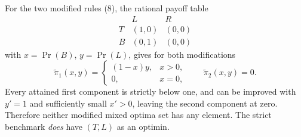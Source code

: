 \documentclass[11pt,a4paper]{article}
\begin{document}
For the two modified rules (8), the rational payoff table
\[
 \begin{array}{c|cc}
 &L&R\\\hline
 T&(1,0)&(0,0)\\
 B&(0,1)&(0,0)
 \end{array}
\tag{OPT.15}
\]
with $x=\Pr(B)$, $y=\Pr(L)$, gives for both modifications
\[
 \widetilde\pi_1(x,y)=\begin{cases}(1-x)y,&x>0,\\0,&x=0,\end{cases}
 \qquad\widetilde\pi_2(x,y)=0.
\tag{OPT.16}
\]
Every attained first component is strictly below one, and can be improved with $y'=1$ and sufficiently small $x'>0$, leaving the second component at zero. Therefore neither modified mixed optima set has any element. The strict benchmark \emph{does} have $(T,L)$ as an optimin.
\end{document}
